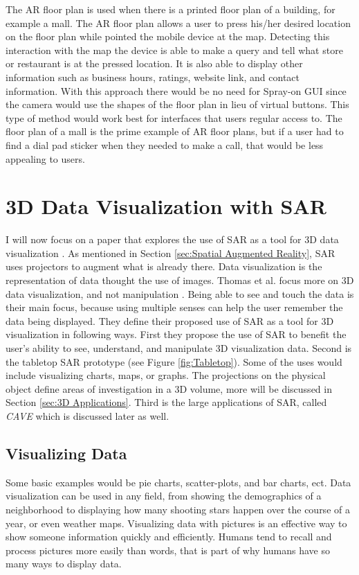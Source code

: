 \documentclass{sig-alternate}
\begin{document}
The AR floor plan is used when there is a printed floor plan of a building, for example a mall. The AR floor plan allows a user to press his/her desired location on the floor plan while pointed the mobile device at the map. Detecting this interaction with the map the device is able to make a query and tell what store or restaurant is at the pressed location. It is also able to display other information such as business hours, ratings, website link, and contact information. With this approach there would be no need for Spray-on GUI since the camera would use the shapes of the floor plan in lieu of virtual buttons. This type of method would work best for interfaces that users regular access to. The floor plan of a mall is the prime example of AR floor plans, but if a user had to find a dial pad sticker when they needed to make a call, that would be less appealing to users.      


\section{3D Data Visualization with SAR}
\label{sec:3D Data Visualization}
I will now focus on a paper that explores the use of SAR as a tool for 3D data visualization \cite{3D}. As mentioned in Section \ref{sec:Spatial Augmented Reality}, SAR uses projectors to augment what is already there. Data visualization is the representation of data thought the use of images. Thomas et al. focus more on 3D data visualization, and not manipulation \cite{3D}. Being able to see and touch the data is their main focus, because using multiple senses can help the user remember the data being displayed. They define their proposed use of SAR as a tool for 3D visualization in following ways. First they propose the use of SAR to benefit the user's ability to see, understand, and manipulate 3D visualization data. Second is the tabletop SAR prototype (see Figure \ref{fig:Tabletop}). Some of the uses would include visualizing charts, maps, or graphs. The projections on the physical object define areas of investigation in a 3D volume, more will be discussed in Section \ref{sec:3D Applications}. Third is the large applications of SAR, called \textit{CAVE} which is discussed later as well.

\subsection{Visualizing Data}
\label{sec:Visualizing Data}
Some basic examples would be pie charts, scatter-plots, and bar charts, ect. Data visualization can be used in any field, from showing the demographics of a neighborhood to displaying how many shooting stars happen over the course of a year, or even weather maps. Visualizing data with pictures is an effective way to show someone information quickly and efficiently. Humans tend to recall and process pictures more easily than words, that is part of why humans have so many ways to display data.   
\end{document}
